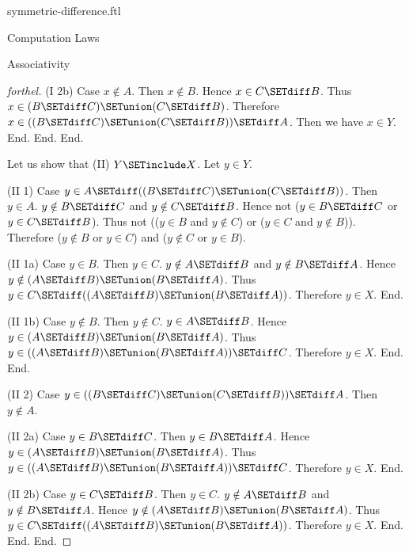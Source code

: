\documentclass{naproche-library}
\begin{document}
\begin{smodule}[title=Symmetric Difference]{symmetric-difference.ftl}
\begin{sfragment}{Computation Laws}
\begin{sfragment}{Associativity}
\begin{proof}[forthel]
          (I 2b) Case $x \notin A$.
            Then $x \notin B$.
            Hence $x \in C \SETdiff B$.
            Thus $x \in (B \SETdiff C) \SETunion (C \SETdiff B)$.
            Therefore $x \in ((B \SETdiff C) \SETunion (C \SETdiff B)) \SETdiff A$.
            Then we have $x \in Y$.
          End.
        End.
      End.

      Let us show that (II) $Y \SETinclude X$.
        Let $y \in Y$.

        (II 1) Case $y \in A \SETdiff ((B \SETdiff C) \SETunion (C \SETdiff B))$.
          Then $y \in A$.
          $y \notin B \SETdiff C$ and $y \notin C \SETdiff B$.
          Hence not ($y \in B \SETdiff C$ or $y \in C \SETdiff B$).
          Thus not (($y \in B$ and $y \notin C$) or ($y \in C$ and $y \notin B$)).
          Therefore ($y \notin B$ or $y \in C$) and ($y \notin C$ or $y \in B$).

          (II 1a) Case $y \in B$.
            Then $y \in C$.
            $y \notin A \SETdiff B$ and $y \notin B \SETdiff A$.
            Hence $y \notin (A \SETdiff B) \SETunion (B \SETdiff A)$.
            Thus $y \in C \SETdiff ((A \SETdiff B) \SETunion (B \SETdiff A))$.
            Therefore $y \in X$.
          End.

          (II 1b) Case $y \notin B$.
            Then $y \notin C$.
            $y \in A \SETdiff B$.
            Hence $y \in (A \SETdiff B) \SETunion (B \SETdiff A)$.
            Thus $y \in ((A \SETdiff B) \SETunion (B \SETdiff A)) \SETdiff C$.
            Therefore $y \in X$.
          End.
        End.

        (II 2) Case $y \in ((B \SETdiff C) \SETunion (C \SETdiff B)) \SETdiff A$.
          Then $y \notin A$.

          (II 2a) Case $y \in B \SETdiff C$.
            Then $y \in B \SETdiff A$.
            Hence $y \in (A \SETdiff B) \SETunion (B \SETdiff A)$.
            Thus $y \in ((A \SETdiff B) \SETunion (B \SETdiff A)) \SETdiff C$.
            Therefore $y \in X$.
          End.

          (II 2b) Case $y \in C \SETdiff B$.
            Then $y \in C$.
            $y \notin A \SETdiff B$ and $y \notin B \SETdiff A$.
            Hence $y \notin (A \SETdiff B) \SETunion (B \SETdiff A)$.
            Thus $y \in C \SETdiff ((A \SETdiff B) \SETunion (B \SETdiff A))$.
            Therefore $y \in X$.
          End.
        End.
      End.
    \end{proof}
  \end{sfragment}


\end{sfragment}
\end{smodule}
\end{document}
